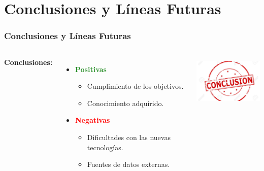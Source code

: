 \documentclass[usenames,dvipsnames]{beamer}
\begin{document}
\section{Conclusiones y Líneas Futuras}
\begin{frame}
\frametitle{Conclusiones y Líneas Futuras}
\begin{columns}[c] %

\textbf{Conclusiones:}
\vspace{0.4cm}
\begin{itemize}

	\item \textbf{\textcolor{ForestGreen}{Positivas}}
		\begin{itemize}
			\item Cumplimiento de los objetivos.
			\item Conocimiento adquirido.
		\end{itemize}
	\vspace{0.5cm}
	\item \textbf{\textcolor{Red}{Negativas}}
		\begin{itemize}
			\item Dificultades con las nuevas tecnologías.
			\item Fuentes de datos externas.
		\end{itemize}
\end{itemize}

\vspace{-3cm}
\includegraphics[height=2.5cm, angle=0]{./img/conlcusion.jpg}
\end{columns}
\end{frame}
\end{document}
